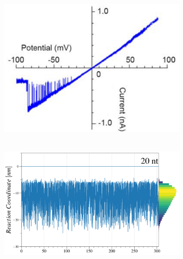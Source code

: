 \begin{figure}[ht!]
  \begin{centering}
  \begin{subfigure}[t]{\dimexpr.3\linewidth-1.3em\relax}
  \centering
  \vspace{0.15cm}
  \hbox{\hspace{0.35cm}
  \includegraphics[width=1.05\linewidth,valign=t]{Figures/IV-80.png}}
  \end{subfigure}%
  \hspace{-0.5cm}
  \begin{subfigure}[t]{\dimexpr.5\linewidth-1.3em\relax}
  \centering
  \hbox{\hspace{0.56cm}
  \includegraphics[width=.95\linewidth,valign=t]{Figures/MR-80.png}}
  \end{subfigure}%
  \hspace{.5cm}
  \begin{subfigure}[t]{\dimexpr.21\linewidth-1.3em\relax}

\end{subfigure}
\end{centering}
\end{figure}
